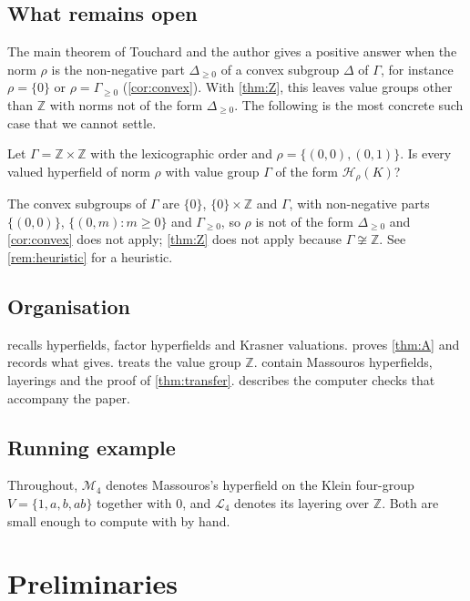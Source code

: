\documentclass[11pt]{amsart}
\numberwithin{equation}{section}
\newcommand{\Hr}{\mathcal H_\rho}
\newcommand{\Mas}{\mathcal M}
\newcommand{\Lay}{\mathcal L}
\newcommand{\Z}{\mathbb Z}
\begin{document}
\subsection{What remains open}
The main theorem of Touchard and the author \cite[Theorem~4.1]{LT25} gives a positive answer when the norm $\rho$ is the non-negative part $\Delta_{\ge0}$ of a convex subgroup $\Delta$ of $\Gamma$, for instance $\rho=\{0\}$ or $\rho=\Gamma_{\ge0}$ (\cref{cor:convex}). With \cref{thm:Z}, this leaves value groups other than $\Z$ with norms not of the form $\Delta_{\ge0}$. The following is the most concrete such case that we cannot settle.

\begin{questionprime}
Let $\Gamma=\Z\times\Z$ with the lexicographic order and $\rho=\{(0,0),(0,1)\}$. Is every valued hyperfield of norm $\rho$ with value group $\Gamma$ of the form $\Hr(K)$?
\end{questionprime}

The convex subgroups of $\Gamma$ are $\{0\}$, $\{0\}\times\Z$ and $\Gamma$, with non-negative parts $\{(0,0)\}$, $\{(0,m):m\ge0\}$ and $\Gamma_{\ge0}$, so $\rho$ is not of the form $\Delta_{\ge0}$ and \cref{cor:convex} does not apply; \cref{thm:Z} does not apply because $\Gamma\not\cong\Z$. See \cref{rem:heuristic} for a heuristic.

\subsection{Organisation}
 recalls hyperfields, factor hyperfields and Krasner valuations.  proves \cref{thm:A} and records what \cite[Theorem~4.1]{LT25} gives.  treats the value group $\Z$.  contain Massouros hyperfields, layerings and the proof of \cref{thm:transfer}.  describes the computer checks that accompany the paper.

\subsection*{Running example}
Throughout, $\Mas_4$ denotes Massouros's hyperfield on the Klein four-group $V=\{1,a,b,ab\}$ together with $0$, and $\Lay_4$ denotes its layering over $\Z$. Both are small enough to compute with by hand.

\section{Preliminaries}\label{sec:prelim}
\end{document}
